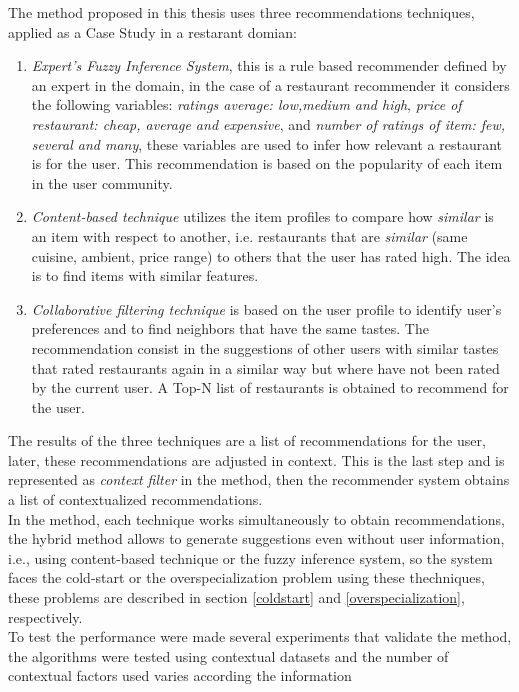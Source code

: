 The method proposed in this thesis uses three recommendations techniques,
applied as a Case Study in a restarant domian:
\begin{enumerate} 
\item \textit{Expert's Fuzzy Inference System}, this is a rule based recommender
defined by an expert in the domain, in the case of a restaurant recommender
it considers the following
variables: \textit{ratings average: low,medium and high},
\textit{price of restaurant: cheap, average and expensive}, and
\textit{number of ratings of item: few, several and many}, these
variables are used to infer how relevant a restaurant is for the user.
This recommendation is based on the popularity of each item in the
user community.
\item \textit{Content-based technique} utilizes the item profiles 
to compare how \textit{similar} is an item with respect to 
another, i.e. restaurants that are \textit{similar} (same cuisine, 
ambient, price range) to others that the user has rated high. 
The idea is to find items with similar features. 
\item \textit{Collaborative filtering technique} is based on the user
profile to identify user's preferences and to find neighbors that
have the same tastes. The recommendation consist in the suggestions of
other users with similar tastes that rated restaurants again in a
similar way but where have not been rated by the current user. A Top-N
list of restaurants is obtained to recommend for the user.
\end{enumerate} 
The results of the three techniques are a list of recommendations for
the user, later, these recommendations are adjusted in context. This
is the last step and is represented as \textit{context filter} in the
method, then the recommender system obtains a list of contextualized
recommendations. \\
In the method, each technique works simultaneously to obtain
recommendations, the hybrid method allows to generate suggestions even
without user information, i.e., using content-based technique or the
fuzzy inference system, so the system faces the cold-start or the
overspecialization problem using these thechniques, these problems are
described in section \ref{coldstart} and 
\ref{overspecialization}, respectively.\\
To test the performance were made several experiments that validate
the method, the algorithms were tested using contextual datasets and
the number of contextual factors used varies according the information
